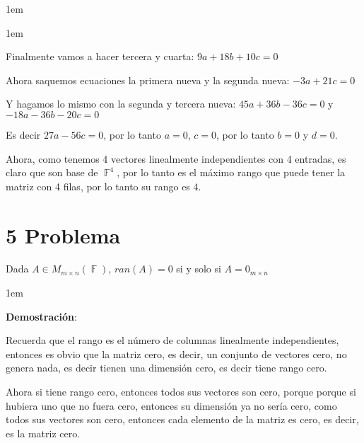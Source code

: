 \documentclass[12pt, fleqn]{article}                             %
\newenvironment{SmallIndentation}[1][0.75em]                    %
        {\begin{adjustwidth}{#1}{}\begin{footnotesize}}             %
        {\end{footnotesize}\end{adjustwidth}}                       %
\theoremstyle{break}                                            %
\DeclareMathOperator \GenericField {\mathbb{F}}                 %
\begin{document}
\begin{itemize}
\begin{SmallIndentation}[1em]
\begin{SmallIndentation}[1em]
                    Finalmente vamos a hacer tercera y cuarta:
                    $9a + 18b + 10c = 0$

                    Ahora saquemos ecuaciones la primera nueva y la segunda nueva:
                    $-3a + 21c = 0$

                    Y hagamos lo mismo con la segunda y tercera nueva:
                    $45a + 36b - 36c = 0$ y $-18a - 36b - 20c = 0$

                    Es decir $27a - 56c = 0$, por lo tanto $a = 0$, $c = 0$, por lo tanto $b = 0$ y $d = 0$.

                \end{SmallIndentation}

                Ahora, como tenemos 4 vectores linealmente independientes con 4 entradas, es claro que son base de $\GenericField^4$, por lo
                tanto es el máximo rango que puede tener la matriz con 4 filas, por lo tanto su rango es $4$.


            \end{SmallIndentation}


    \end{itemize}




\clearpage
\section{5 Problema}

    Dada $A \in M_{m \times n}(\GenericField)$, $ran(A) = 0$ si y solo si $A = 0_{m \times n}$

    \begin{SmallIndentation}[1em]
        \textbf{Demostración}:
        
        Recuerda que el rango es el número de columnas linealmente independientes, entonces
        es obvio que la matriz cero, es decir, un conjunto de vectores cero, no genera nada, es decir
        tienen una dimensión cero, es decir tiene rango cero.

        Ahora si tiene rango cero, entonces todos sus vectores son cero, porque porque si hubiera uno que no
        fuera cero, entonces su dimensión ya no sería cero, como todos sus vectores son cero, entonces
        cada elemento de la matriz es cero, es decir, es la matriz cero.
    
    \end{SmallIndentation}
        
\end{document}
